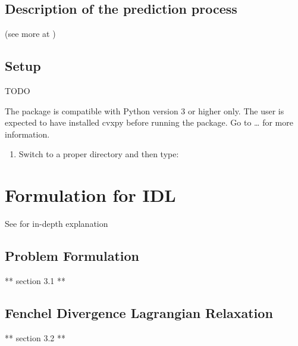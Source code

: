 \documentclass[letterpaper,10pt,english]{sphinxmanual}
\begin{document}
\section{Description of the prediction process}
\label{\detokenize{sections/introduction:description-of-the-prediction-process}}
(see more at {\hyperref[\detokenize{sections/prediction:prediction}]{}})


\section{Setup}
\label{\detokenize{sections/introduction:setup}}
TODO

The package is compatible with Python version 3 or higher only.
The user is expected to have installed cvxpy before running the package.
Go to … for more information.
\begin{enumerate}
%
\item {} 
Switch to a proper directory and then type:

\end{enumerate}

\begin{sphinxVerbatim}[commandchars=\\\{\}]
   
\end{sphinxVerbatim}


\chapter{Formulation for IDL}
\label{\detokenize{sections/bi_convex_formulation:formulation-for-idl}}\label{\detokenize{sections/bi_convex_formulation:formulation}}\label{\detokenize{sections/bi_convex_formulation::doc}}
See {\hyperref[\detokenize{sections/citing:citing}]{}} for in-depth explanation


\section{Problem Formulation}
\label{\detokenize{sections/bi_convex_formulation:problem-formulation}}
** section 3.1 **


\section{Fenchel Divergence Lagrangian Relaxation}
\label{\detokenize{sections/bi_convex_formulation:fenchel-divergence-lagrangian-relaxation}}
** section 3.2 **
\end{document}
